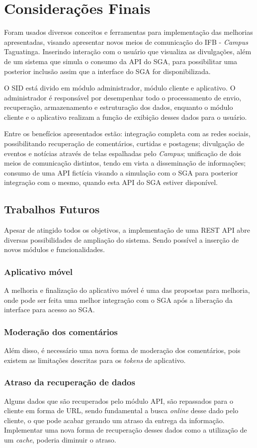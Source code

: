 

\chapter[Considerações Finais]{Considerações Finais}
\label{consideracoes}
Foram usados diversos conceitos e ferramentas para implementação das melhorias apresentadas, visando apresentar novos meios de comunicação do IFB - \textit{Campus} Taguatinga. Inserindo interação com o usuário que visualiza as divulgações, além de um sistema que simula o consumo da API do SGA, para possibilitar uma posterior inclusão assim que a interface do SGA for disponibilizada.

O SID está divido em módulo administrador, módulo cliente e aplicativo. O administrador é responsável por desempenhar todo o processamento de envio, recuperação, armazenamento e estruturação dos dados, enquanto o módulo cliente e o aplicativo realizam a função de exibição desses dados para o usuário. 

Entre os benefícios apresentados estão: integração completa com as redes sociais, possibilitando recuperação de comentários, curtidas e postagens; divulgação de eventos e notícias através de telas espalhadas pelo \textit{Campus}; unificação de dois meios de comunicação distintos, tendo em vista a disseminação de informações; consumo de uma API fictícia visando a simulação com o SGA para posterior integração com o mesmo, quando esta API do SGA estiver disponível.

\section{Trabalhos Futuros}
Apesar de atingido todos os objetivos, a implementação de uma REST API abre diversas possibilidades de ampliação do sistema. Sendo possível a inserção de novos módulos e funcionalidades.

\subsection{Aplicativo móvel}
A melhoria e finalização do aplicativo móvel é uma das propostas para melhoria, onde pode ser feita uma melhor integração com o SGA após a liberação da interface para acesso ao SGA.

\subsection{Moderação dos comentários}
Além disso, é necessário uma nova forma de moderação dos comentários, pois existem as limitações descritas para os \textit{tokens} de aplicativo.

\subsection{Atraso da recuperação de dados}
Alguns dados que são recuperados pelo módulo API, são repassados para o cliente em forma de URL, sendo fundamental a busca \textit{online} desse dado pelo cliente, o que pode acabar gerando um atraso da entrega da informação. Implementar uma nova forma de recuperação desses dados como a utilização de um \textit{cache}, poderia diminuir o atraso. 
